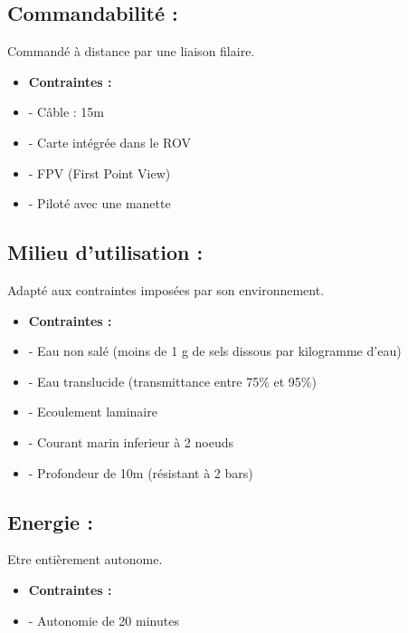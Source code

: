 \documentclass[a4paper,11pt]{report}
\begin{document}
\subsection{Commandabilité :}
Commandé à distance par une liaison filaire.\newline
\begin{itemize}
	\item \textbf{Contraintes :}
	\item - Câble : 15m
	\item - Carte intégrée dans le ROV
	\item - FPV (First Point View)
	\item - Piloté avec une manette \newline \newline
\end{itemize}

\subsection{Milieu d'utilisation :}
Adapté aux contraintes imposées par son environnement. \newline
\begin{itemize}
	\item \textbf{Contraintes :}
	\item - Eau non salé (moins de 1 g de sels dissous par kilogramme d'eau)
	\item - Eau translucide (transmittance entre 75\% et 95\%)
	\item - Ecoulement laminaire
	\item - Courant marin inferieur à 2 noeuds
	\item - Profondeur de 10m (résistant à 2 bars) \newline \newline
\end{itemize}

\subsection{Energie :}
Etre entièrement autonome. \newline
\begin{itemize}
	\item \textbf{Contraintes :}
	\item - Autonomie de 20 minutes \newpage
\end{itemize}
\end{document}
